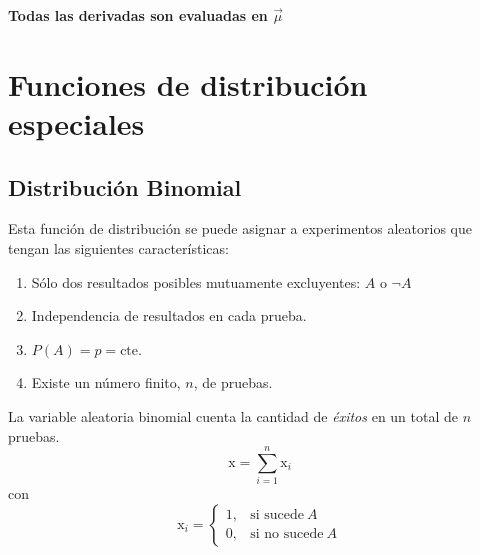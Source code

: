 \documentclass[openany]{book}
\begin{document}
\par \textbf{Todas las derivadas son evaluadas en $\vec{\mu}$}

\chapter{Funciones de distribución especiales}
\section{Distribución Binomial}
Esta función de distribución se puede asignar a experimentos aleatorios que tengan las siguientes características:
\begin{enumerate}
  \item Sólo dos resultados posibles mutuamente excluyentes: $A$ o $\lnot A$
  \item Independencia de resultados en cada prueba.
  \item $P(A)=p=\mathrm{cte}$.
  \item Existe un número finito, $n$, de pruebas.
\end{enumerate}

La variable aleatoria binomial cuenta la cantidad de \emph{éxitos} en un total de $n$ pruebas.
\begin{equation*}
  \mathrm{x}=\sum_{i=1}^{n}\mathrm{x}_{i}
\end{equation*}
con 
\begin{equation*}
  \mathrm{x}_i = \begin{cases}
    1, & \text{si sucede}~ A\\
    0, & \text{si no sucede}~ A
  \end{cases}
\end{equation*}
\end{document}

